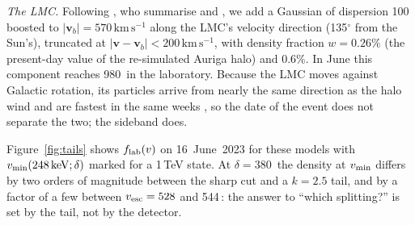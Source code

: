 \documentclass[11pt]{article}
\newcommand{\vmin}{v_{\rm min}\xspace}
\newcommand{\vesc}{v_{\rm esc}\xspace}
\newcommand{\keV}{\,\mathrm{keV}\xspace}
\newcommand{\kms}{\,\mathrm{km\,s^{-1}}\xspace}
\begin{document}
\emph{The LMC.}  Following \citet{HiggsinoSideband2026}, who summarise
\citet{Besla2019lmc} and \citet{SmithOrlik2023lmc}, we add a Gaussian of dispersion
100\kms boosted to $|\mathbf v_b|=570\kms$ along the LMC's velocity direction (135$^\circ$
from the Sun's), truncated at $|\mathbf v-\mathbf v_b|<200\kms$, with density
fraction $w=0.26\%$ (the present-day value of the re-simulated Auriga halo) and
$0.6\%$.  In June this component reaches 980\kms in the laboratory.  Because the LMC
moves against Galactic rotation, its particles arrive from nearly the same direction
as the halo wind and are fastest in the same weeks \citep{Besla2019lmc}, so the date
of the event does not separate the two; the sideband does.

Figure~\ref{fig:tails} shows $f_{\rm lab}(v)$ on 16~June~2023 for these models with
$\vmin(248\keV;\delta)$ marked for a 1\,TeV state.  At $\delta=380$\keV the density at
$\vmin$ differs by two orders of magnitude between the sharp cut and a $k=2.5$ tail,
and by a factor of a few between $\vesc=528$ and 544\kms: the answer to ``which
splitting?'' is set by the tail, not by the detector.
\end{document}
